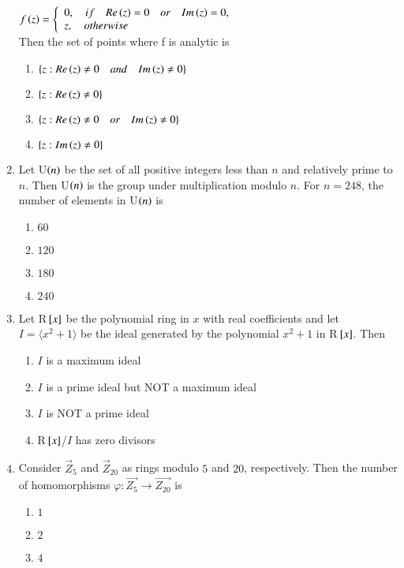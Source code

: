 \documentclass[journal,12pt,onecolumn]{IEEEtran}
\theoremstyle{remark}
\begin{document}
\begin{enumerate}
    $f\left(z\right)=\left\{ \begin{array}{ll} 0,\quad if \quad Re\left(z\right)=0 \quad or \quad Im\left(z\right)=0,\\ z, \quad otherwise \end{array} \right. $\\
    Then the set of points where f is analytic is 
    \begin{enumerate}
        \item $\left\{z:Re\left(z\right) \neq 0  \quad and \quad Im\left(z\right) \neq 0\right\}$
        \item $\left\{z:Re\left(z\right) \neq 0\right\}$
        \item $\left\{z:Re\left(z\right) \neq 0  \quad or \quad Im\left(z\right) \neq 0\right\}$
        \item $\left\{z:Im\left(z\right) \neq 0\right\}$
    \end{enumerate}
    \item Let U$\left(n\right)$ be the set of all positive integers less than $n$ and relatively prime to $n$. Then U$\left(n\right)$ is the group under multiplication modulo $n$. For $n=248$, the number of elements in U$\left(n\right)$ is 
    \begin{enumerate}
        \item $60$
        \item $120$
        \item $180$
        \item $240$
    \end{enumerate}
    \item Let R${}\left[x\right]$ be the polynomial ring in $x$ with real coefficients and let $I=\langle x^2+1\rangle$ be the ideal generated by the polynomial $x^2+1$ in R${}\left[x\right]$. Then
    \begin{enumerate}
        \item $I$ is a maximum ideal
        \item $I$ is a prime ideal but NOT a maximum ideal
        \item $I$ is NOT a prime ideal
        \item R${}\left[x\right]$/$I$ has zero divisors
    \end{enumerate}
    \item Consider $\vec{Z}_5$ and $\vec{Z}_{20}$ as rings modulo $5$ and $20$, respectively. Then the number of homomorphisms $\varphi : \vec{Z_5} \to \vec{Z_{20}}$ is 
    \begin{enumerate}
        \item $1$
        \item $2$
        \item $4$

\end{enumerate}
\end{enumerate}
\end{document}
